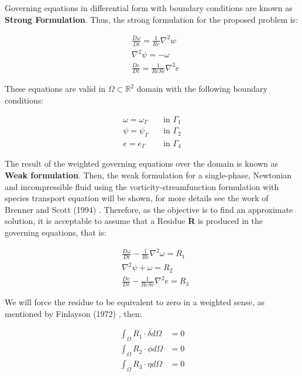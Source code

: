 Governing equations in differential form 
with boundary conditions are known as \textbf{Strong Formulation}. 
Thus, the strong formulation for the proposed problem is:

\begin{align}
& \frac{D \omega}{D t}
 =
 \frac{1}{Re} \nabla^{2} w
 \\[10pt] 
& \nabla^{2} \psi
 = 
 - 
 \omega \\[10pt]
& \frac{D e}{Dt}
 =
 \frac{1}{ReSc} \nabla^{2} e
\end{align}


\medskip
\noindent
These equations are valid in 
$\Omega \subset \mathbb{R}^2$ domain
with the following boundary conditions:

\begin{equation} \label{bc}
 \begin{aligned}
  \omega = \omega_\Gamma \quad & \mbox{in $\Gamma_1$}\\
  \psi = \psi_\Gamma \quad & \mbox{in $\Gamma_2$}\\
  e = e_\Gamma \quad & \mbox{in $\Gamma_4$}
\end{aligned}
\end{equation}

\vspace{1cm}
The result of the weighted governing equations over the domain 
is known as \textbf{Weak formulation}.
Then, the weak formulation 
for a single-phase, Newtonian and incompressible fluid using 
the vorticity-streamfunction formulation with species transport equation
will be shown, for more details see the work of Brenner and Scott (1994) 
\cite{brenner1994}. 
Therefore, as the objective is to find an approximate solution, 
it is acceptable to assume that a Residue \textbf{R} 
is produced in the governing equations, that is:


\begin{align}
& \frac{D \omega}{D t}
 -
 \frac{1}{Re} \nabla^{2} \omega
 = R_1 \\[10pt] 
& \nabla^{2} \psi
 + 
 \omega
 = R_2 \\[10pt]
& \frac{D e}{Dt}
 -
 \frac{1}{ReSc} \nabla^{2} e
 = R_3
\end{align}

\medskip
We will force the residue to be equivalent to zero 
in a weighted sense, as mentioned by Finlayson (1972) \cite{finlayson1972}, then:

\begin{align}
 \int_{\Omega} R_1 \cdot \delta d\Omega &= 0 \\
 \int_{\Omega} R_2 \cdot \phi d\Omega &= 0 \\
 \int_{\Omega} R_3 \cdot \eta d\Omega &= 0
\end{align}



